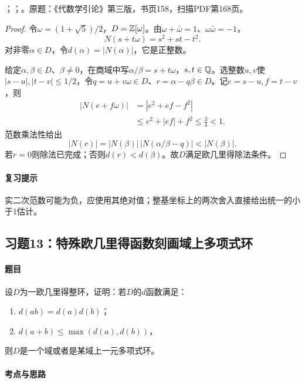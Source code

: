 ；；。原题：《代数学引论》第三版，书页158，扫描PDF第168页。


\begin{proof}

令$\omega=(1+\sqrt5)/2$，$D=\mathbb Z[\omega]$。由$\omega+\bar\omega=1$、$\omega\bar\omega=-1$，
\[
N(s+t\omega)=s^2+st-t^2.
\]
对非零$\alpha\in D$，令$d(\alpha)=|N(\alpha)|$，它是正整数。

给定$\alpha,\beta\in D$、$\beta\ne0$，在商域中写$\alpha/\beta=s+t\omega$，$s,t\in\mathbb Q$。选整数$u,v$使$|s-u|,|t-v|\le1/2$，令$q=u+v\omega\in D$、$r=\alpha-q\beta\in D$。记$e=s-u,f=t-v$，则
\begin{align*}
|N(e+f\omega)|&=|e^2+ef-f^2|\\
&\le e^2+|ef|+f^2\le\frac34<1.
\end{align*}
范数乘法性给出
\[
|N(r)|=|N(\beta)|\,|N(\alpha/\beta-q)|<|N(\beta)|.
\]
若$r=0$则除法已完成；否则$d(r)<d(\beta)$。故$D$满足欧几里得除法条件。

\end{proof}

\paragraph{复习提示}

实二次范数可能为负，应使用其绝对值；整基坐标上的两次舍入直接给出统一的小于1估计。

\subsection{习题13：特殊欧几里得函数刻画域上多项式环}

\label{ex:4:13}

\paragraph{题目}

设$D$为一欧几里得整环，证明：若$D$的$d$函数满足：
\begin{enumerate}[label=(\roman*)]
\item $d(ab)=d(a)d(b)$；
\item $d(a+b)\le\max(d(a),d(b))$，
\end{enumerate}
则$D$是一个域或者是某域上一元多项式环。

\paragraph{考点与思路}

